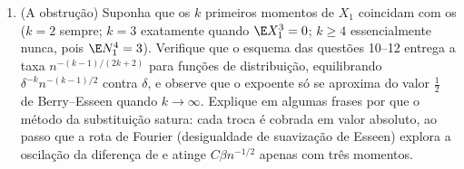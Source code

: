 \begin{problem}
\begin{enumerate}[resume]
{        $\delta = n^{-1/4}$)}.
  \item (A obstrução) Suponha que os $k$ primeiros momentos de
        $X_1$ coincidam com os  ($k = 2$ sempre;
        $k = 3$ exatamente quando $\E X_1^3 = 0$; $k \geq 4$ essencialmente nunca,
        pois $\E N_1^4 = 3$). Verifique que o esquema das questões 10--12 entrega
        a taxa $n^{-(k-1)/(2k+2)}$ para funções de distribuição, equilibrando $\delta^{-k}n^{-(k-1)/2}$
        contra $\delta$, e observe que o expoente só se aproxima do
        valor $\frac12$ de Berry--Esseen quando $k \to
        \infty$. Explique em algumas
        frases por que o método da substituição satura: cada troca é
        cobrada em valor absoluto, ao passo que a rota de Fourier
        (desigualdade de suavização de Esseen) explora a oscilação da
        diferença de  e atinge $C\beta n^{-1/2}$ apenas com
        três momentos.
\end{enumerate}


\end{problem}
